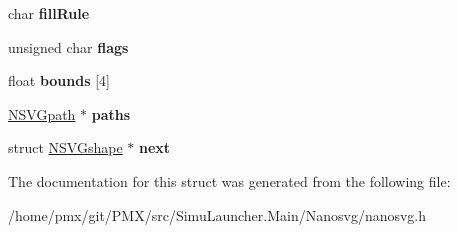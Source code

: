 \begin{DoxyCompactItemize}
char {\bfseries fill\+Rule}
\item 
\mbox{\label{structNSVGshape_a9aa4edfee40c4a3558bb34af06de4943}} 
unsigned char {\bfseries flags}
\item 
\mbox{\label{structNSVGshape_ac88e2f7af799bc9736956cd637933586}} 
float {\bfseries bounds} \mbox{[}4\mbox{]}
\item 
\mbox{\label{structNSVGshape_a15b1de5a99ff8fe3e5597e95080be87f}} 
\hyperlink{structNSVGpath}{N\+S\+V\+Gpath} $\ast$ {\bfseries paths}
\item 
\mbox{\label{structNSVGshape_a72513ada67dc08af8a484f024b44d485}} 
struct \hyperlink{structNSVGshape}{N\+S\+V\+Gshape} $\ast$ {\bfseries next}
\end{DoxyCompactItemize}


The documentation for this struct was generated from the following file\+:\begin{DoxyCompactItemize}
\item 
/home/pmx/git/\+P\+M\+X/src/\+Simu\+Launcher.\+Main/\+Nanosvg/nanosvg.\+h\end{DoxyCompactItemize}
